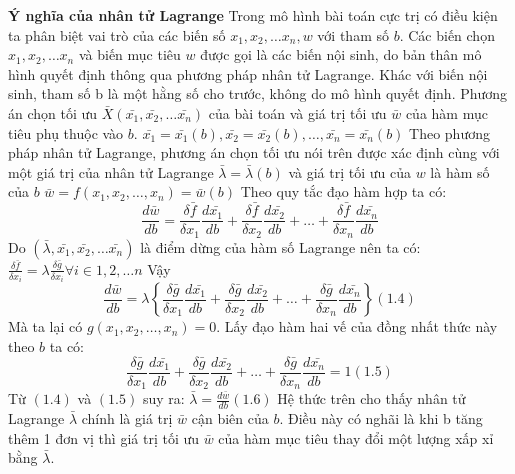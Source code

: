 \documentclass{article}
\begin{document}
\begin{enumerate}
        \textbf{Ý nghĩa của nhân tử Lagrange} \newline 
        Trong mô hình bài toán cực trị có điều kiện ta phân biệt vai trò của các biến số 
        $x_1, x_2, \dots x_n, w$ với tham số $b$. Các biến chọn  $x_1, x_2, \dots x_n$ và 
        biến mục tiêu $w$ được gọi là các biến nội sinh, do bản thân mô hình quyết định thông qua
        phương pháp nhân tử Lagrange. Khác với biến nội sinh, tham số b là một hằng số cho trước,
        không do mô hình quyết định. Phương án chọn tối ưu $\bar{X}(\bar{x_1}, \bar{x_2}, \dots \bar{x_n})$
        của bài toán và giá trị tối ưu $\bar{w}$ của hàm mục tiêu phụ thuộc vào $b$. \newline 
        $\bar{x_1} = \bar{x_1}(b), \bar{x_2} = \bar{x_2}(b), \dots , \bar{x_n} = \bar{x_n}(b)$ \newline 
        Theo phương pháp nhân tử Lagrange, phương án chọn tối ưu nói trên được xác định cùng với một 
        giá trị của nhân tử Lagrange $\bar{\lambda} = \bar{\lambda}(b)$ và giá trị tối ưu của $w$ là 
        hàm số của $b$ \newline 
        $\bar{w} = f(x_1, x_2, \dots , x_n) = \bar{w}(b)$ \newline 
        Theo quy tắc đạo hàm hợp ta có: \newline 
        $$\frac{d\bar{w}}{db} = \frac{\delta \bar{f}}{\delta x_1} \frac{d \bar{x_1}}{db}
        + \frac{\delta \bar{f}}{\delta x_2} \frac{d \bar{x_2}}{db} 
        + \dots + \frac{\delta \bar{f}}{\delta x_n} \frac{d \bar{x_n}}{db}
        $$
        Do $(\bar{\lambda},\bar{x_1}, \bar{x_2}, \dots \bar{x_n})$ là điểm dừng của hàm số Lagrange nên ta có: \newline
        $\frac{\delta \bar{f}}{\delta x_i} = \lambda \frac{\delta \bar{g}}{\delta x_i} \forall i \in 1,2, \dots n$ \newline 
        Vậy $$\frac{d\bar{w}}{db} = \lambda \left\{   \frac{\delta \bar{g}}{\delta x_1} \frac{d \bar{x_1}}{db}
        + \frac{\delta \bar{g}}{\delta x_2} \frac{d \bar{x_2}}{db} 
        + \dots + \frac{\delta \bar{g}}{\delta x_n} \frac{d \bar{x_n}}{db} \right \}
         (1.4)$$ 
        Mà ta lại có $ g(x_1, x_2, \dots , x_n) = 0$. Lấy đạo hàm hai vế của đồng nhất thức này theo $b$ ta có:
        $$
        \frac{\delta \bar{g}}{\delta x_1} \frac{d \bar{x_1}}{db}
        + \frac{\delta \bar{g}}{\delta x_2} \frac{d \bar{x_2}}{db} 
        + \dots + \frac{\delta \bar{g}}{\delta x_n} \frac{d \bar{x_n}}{db} = 1 (1.5)
        $$
        Từ $(1.4)$ và $(1.5)$ suy ra: $\bar{\lambda} = \frac{d\bar{w}}{db} (1.6)$ \newline 
        Hệ thức trên cho thấy nhân tử Lagrange $\bar{\lambda}$ chính là giá trị $\bar{w}$ cận biên của $b$.
        Điều này có nghãi là khi b tăng thêm 1 đơn vị thì giá trị tối ưu $\bar{w}$ của hàm mục tiêu thay đổi 
        một lượng xấp xỉ bằng $\bar{\lambda}$.



\end{enumerate}
\end{document}
